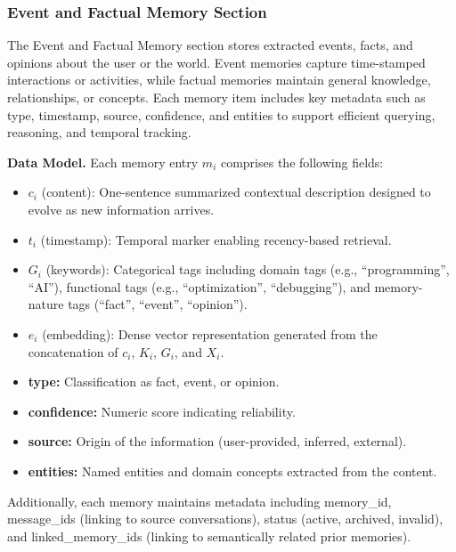 ﻿\documentclass[12pt,a4paper]{article}
\begin{document}
\subsubsection{Event and Factual Memory Section}

The Event and Factual Memory section stores extracted events, facts, and opinions about the user or the world. Event memories capture time-stamped interactions or activities, while factual memories maintain general knowledge, relationships, or concepts. Each memory item includes key metadata such as type, timestamp, source, confidence, and entities to support efficient querying, reasoning, and temporal tracking.

\textbf{Data Model.} Each memory entry $m_i$ comprises the following fields:

\begin{itemize}
    \item $c_i$ (content): One-sentence summarized contextual description designed to evolve as new information arrives.
    
    \item $t_i$ (timestamp): Temporal marker enabling recency-based retrieval.
        
    \item $G_i$ (keywords): Categorical tags including domain tags (e.g., ``programming'', ``AI''), functional tags (e.g., ``optimization'', ``debugging''), and memory-nature tags (``fact'', ``event'', ``opinion'').
    
    \item $e_i$ (embedding): Dense vector representation generated from the concatenation of $c_i$, $K_i$, $G_i$, and $X_i$.
    
    \item \textbf{type:} Classification as fact, event, or opinion.
    
    \item \textbf{confidence:} Numeric score indicating reliability.
    
    \item \textbf{source:} Origin of the information (user-provided, inferred, external).
    
    \item \textbf{entities:} Named entities and domain concepts extracted from the content.
\end{itemize}

Additionally, each memory maintains metadata including memory\_id, message\_ids (linking to source conversations), status (active, archived, invalid), and  linked\_memory\_ids (linking to semantically related prior memories).
\end{document}
